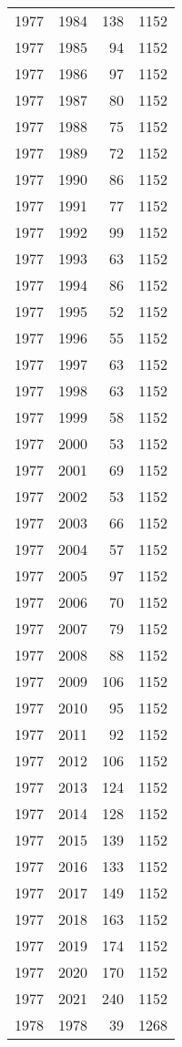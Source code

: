 \documentclass[
  11pt,
  letterpaper,
  DIV=11,
  numbers=noendperiod,
  twoside]{scrartcl}
\begin{document}
\begin{longtable}[]{@{}rrrr@{}}
1977 & 1984 & 138 & 1152 \\
1977 & 1985 & 94 & 1152 \\
1977 & 1986 & 97 & 1152 \\
1977 & 1987 & 80 & 1152 \\
1977 & 1988 & 75 & 1152 \\
1977 & 1989 & 72 & 1152 \\
1977 & 1990 & 86 & 1152 \\
1977 & 1991 & 77 & 1152 \\
1977 & 1992 & 99 & 1152 \\
1977 & 1993 & 63 & 1152 \\
1977 & 1994 & 86 & 1152 \\
1977 & 1995 & 52 & 1152 \\
1977 & 1996 & 55 & 1152 \\
1977 & 1997 & 63 & 1152 \\
1977 & 1998 & 63 & 1152 \\
1977 & 1999 & 58 & 1152 \\
1977 & 2000 & 53 & 1152 \\
1977 & 2001 & 69 & 1152 \\
1977 & 2002 & 53 & 1152 \\
1977 & 2003 & 66 & 1152 \\
1977 & 2004 & 57 & 1152 \\
1977 & 2005 & 97 & 1152 \\
1977 & 2006 & 70 & 1152 \\
1977 & 2007 & 79 & 1152 \\
1977 & 2008 & 88 & 1152 \\
1977 & 2009 & 106 & 1152 \\
1977 & 2010 & 95 & 1152 \\
1977 & 2011 & 92 & 1152 \\
1977 & 2012 & 106 & 1152 \\
1977 & 2013 & 124 & 1152 \\
1977 & 2014 & 128 & 1152 \\
1977 & 2015 & 139 & 1152 \\
1977 & 2016 & 133 & 1152 \\
1977 & 2017 & 149 & 1152 \\
1977 & 2018 & 163 & 1152 \\
1977 & 2019 & 174 & 1152 \\
1977 & 2020 & 170 & 1152 \\
1977 & 2021 & 240 & 1152 \\
1978 & 1978 & 39 & 1268 \\

\end{longtable}
\end{document}
